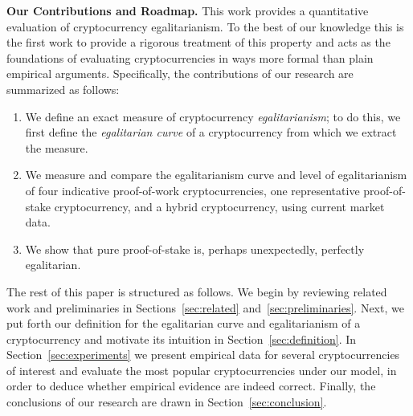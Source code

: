 
\noindent
\textbf{Our Contributions and Roadmap.}
This work provides a quantitative evaluation of cryptocurrency egalitarianism.
To the best of our knowledge this is the first work to provide a rigorous
treatment of this property and acts as the foundations of evaluating
cryptocurrencies in ways more formal than plain empirical arguments.
Specifically, the contributions of our research are summarized as follows:

\begin{enumerate}
  \item We define an exact measure of cryptocurrency
        \emph{egalitarianism}; to do this, we first define the \emph{egalitarian curve} of a
        cryptocurrency from which we extract the measure.
  \item We measure and compare the egalitarianism curve and level of egalitarianism of
        four indicative proof-of-work cryptocurrencies, one representative
        proof-of-stake cryptocurrency, and a hybrid cryptocurrency, using
        current market data.
  \item We show that pure proof-of-stake is, perhaps unexpectedly, perfectly
        egalitarian.
\end{enumerate}

The rest of this paper is structured as follows. We begin by reviewing related
work and preliminaries in Sections~\ref{sec:related}
and~\ref{sec:preliminaries}. Next, we put forth our definition for the
egalitarian curve and egalitarianism of a cryptocurrency and motivate its
intuition in Section~\ref{sec:definition}. In Section~\ref{sec:experiments} we
present empirical data for several cryptocurrencies of interest and evaluate
the most popular cryptocurrencies under our model, in order to deduce whether
empirical evidence are indeed correct. Finally, the conclusions of our research
are drawn in Section~\ref{sec:conclusion}.
